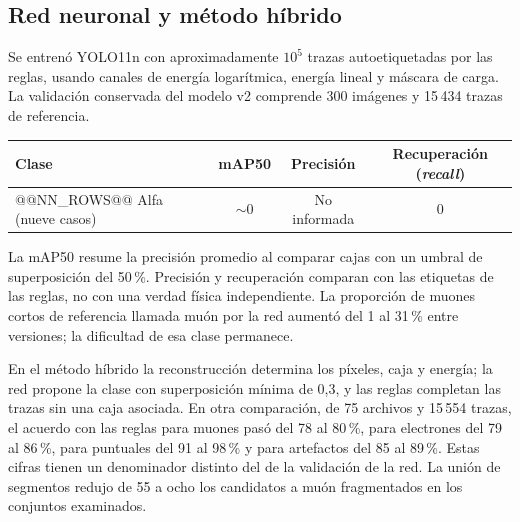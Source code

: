 \documentclass[10pt,a4paper]{article}
\begin{document}
\subsection{Red neuronal y método híbrido}
Se entrenó YOLO11n con aproximadamente $10^5$ trazas autoetiquetadas por las reglas, usando canales de energía logarítmica, energía lineal y máscara de carga. La validación conservada del modelo v2 comprende 300 imágenes y 15\,434 trazas de referencia.
\begin{center}\small
\begin{tabular}{@{}lccc@{}}\toprule
Clase & mAP50 & Precisión & Recuperación (\emph{recall}) \\\midrule
@@NN_ROWS@@
Alfa (nueve casos) & $\sim0$ & No informada & 0 \\\bottomrule
\end{tabular}\end{center}
La mAP50 resume la precisión promedio al comparar cajas con un umbral de superposición del 50\,\%. Precisión y recuperación comparan con las etiquetas de las reglas, no con una verdad física independiente. La proporción de muones cortos de referencia llamada muón por la red aumentó del 1 al 31\,\% entre versiones; la dificultad de esa clase permanece.

En el método híbrido la reconstrucción determina los píxeles, caja y energía; la red propone la clase con superposición mínima de 0{,}3, y las reglas completan las trazas sin una caja asociada. En otra comparación, de 75 archivos y 15\,554 trazas, el acuerdo con las reglas para muones pasó del 78 al 80\,\%, para electrones del 79 al 86\,\%, para puntuales del 91 al 98\,\% y para artefactos del 85 al 89\,\%. Estas cifras tienen un denominador distinto del de la validación de la red. La unión de segmentos redujo de 55 a ocho los candidatos a muón fragmentados en los conjuntos examinados.

\newpage
\end{document}
